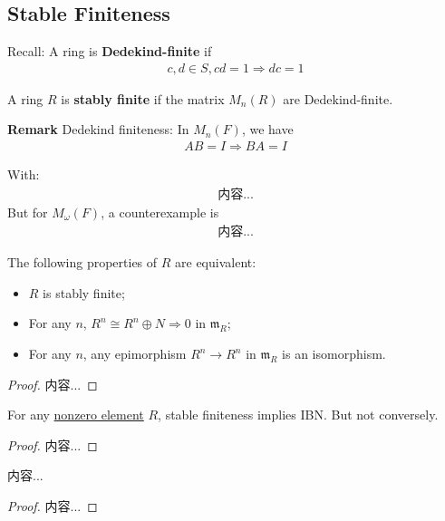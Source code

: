 \documentclass[Total.tex]{subfiles}
\begin{document}
			\subsection{Stable Finiteness}
				\begin{Def}
					Recall: A ring is \textbf{Dedekind-finite} if
					\begin{gather*}
						c,d\in S,cd=1\Rightarrow dc=1
					\end{gather*}
					
					A ring $R$ is \textbf{stably finite} if the matrix $M_n(R)$ are Dedekind-finite.
				\end{Def}
				
				\textbf{Remark} Dedekind finiteness: In $M_n(F)$, we have
				\begin{gather*}
					AB=I\Rightarrow BA=I
				\end{gather*}
				
				With:
				\begin{gather*}
					内容...
				\end{gather*}
				But for $M_{\omega}(F)$, a counterexample is
				\begin{gather*}
					内容...
				\end{gather*}
				\begin{proposition}
					The following properties of $R$ are equivalent:
					
					\begin{itemize}
						\item $R$ is stably finite;
						\item For any $n$, $R^n\cong R^n\oplus N\Rightarrow 0$ in $\mathfrak{m}_R$;
						\item For any $n$, any epimorphism $R^n\rightarrow R^n$ in $\mathfrak{m}_R$ is an isomorphism.
					\end{itemize}
				\end{proposition}
				\begin{proof}
					内容...
				\end{proof}
				
				\begin{proposition}
					For any \underline{nonzero element} $R$, stable finiteness implies IBN. But not conversely.
				\end{proposition}
				
				\begin{proof}
					内容...
				\end{proof}
				
				\begin{proposition}
					内容...
				\end{proposition}
				\begin{proof}
					内容...
				\end{proof}
\end{document}

